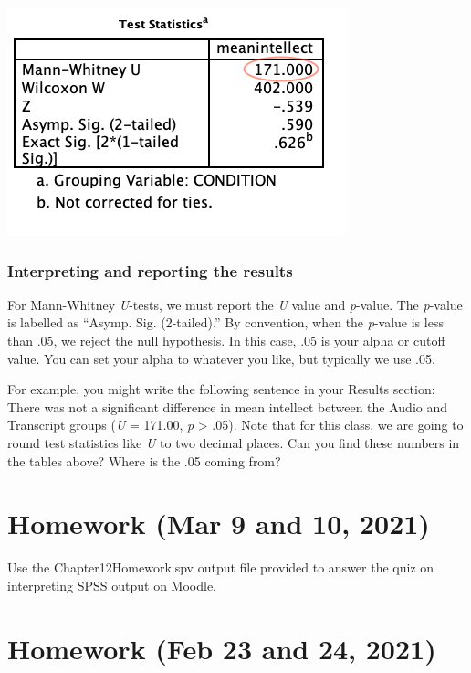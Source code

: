 \documentclass[
]{book}
\begin{document}
\includegraphics{img/12.2.10.png}

\hypertarget{interpreting-and-reporting-the-results-2}{%
\subsubsection{Interpreting and reporting the results}\label{interpreting-and-reporting-the-results-2}}

For Mann-Whitney \emph{U}-tests, we must report the \emph{U} value and \emph{p}-value. The \emph{p}-value is labelled as ``Asymp. Sig. (2-tailed).'' By convention, when the \emph{p}-value is less than .05, we reject the null hypothesis. In this case, .05 is your alpha or cutoff value. You can set your alpha to whatever you like, but typically we use .05.

For example, you might write the following sentence in your Results section:
There was not a significant difference in mean intellect between the Audio and Transcript groups (\emph{U} = 171.00, \emph{p} \textgreater{} .05).
Note that for this class, we are going to round test statistics like \emph{U} to two decimal places. Can you find these numbers in the tables above? Where is the .05 coming from?

\hypertarget{homework-mar-9-and-10-2021}{%
\section{Homework (Mar 9 and 10, 2021)}\label{homework-mar-9-and-10-2021}}

Use the Chapter12Homework.spv output file provided to answer the quiz on interpreting SPSS output on Moodle.

\hypertarget{homework-feb-23-and-24-2021}{%
\section{Homework (Feb 23 and 24, 2021)}\label{homework-feb-23-and-24-2021}}
\end{document}
